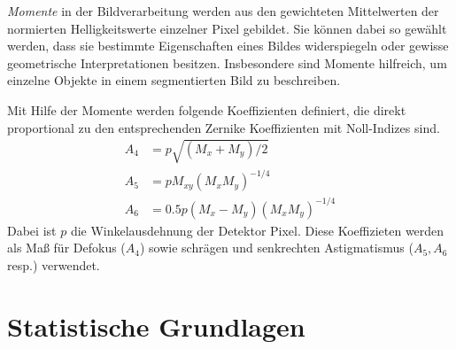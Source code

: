 \begin{mdframed}[style=emphasis]
\emph{Momente} in der Bildverarbeitung werden aus den gewichteten Mittelwerten der normierten Helligkeitswerte einzelner Pixel gebildet. Sie können dabei so gewählt werden, dass sie bestimmte Eigenschaften eines Bildes widerspiegeln oder gewisse geometrische Interpretationen besitzen. Insbesondere sind Momente hilfreich, um einzelne Objekte in einem segmentierten Bild zu beschreiben.
\end{mdframed}
Mit Hilfe der Momente werden folgende Koeffizienten definiert, die direkt proportional zu den entsprechenden Zernike Koeffizienten mit Noll-Indizes\cite{noll} sind.
\begin{align}
	A_4 &= p\sqrt{(M_x + M_y)/2}\\
    A_5 &= pM_{xy}(M_xM_y)^{-1/4}\\
    A_6 &= 0.5p(M_x-M_y)(M_xM_y)^{-1/4}
\end{align}
Dabei ist $p$ die Winkelausdehnung der Detektor Pixel. Diese Koeffizieten werden als Maß für Defokus ($A_4$) sowie schrägen und senkrechten Astigmatismus ($A_5, A_6$ resp.) verwendet.
\section{Statistische Grundlagen}
